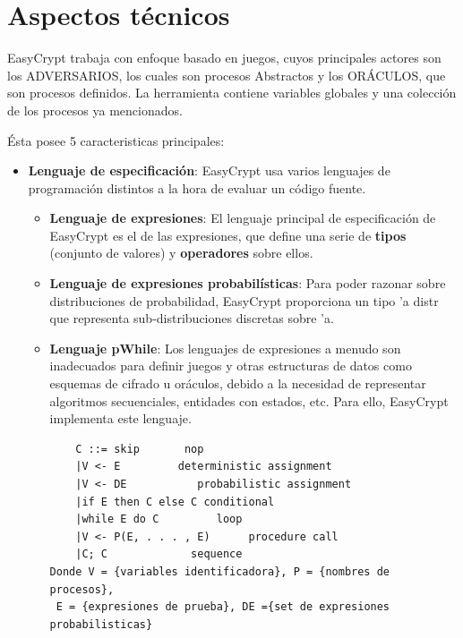 \documentclass[runningheads,a4paper]{llncs}
\begin{document}
\section{Aspectos técnicos}
EasyCrypt trabaja con enfoque basado en juegos, cuyos principales actores son los ADVERSARIOS, los cuales son procesos Abstractos y los ORÁCULOS, que son procesos definidos. La herramienta contiene variables globales y una colección de los procesos ya mencionados.

Ésta posee 5 caracteristicas principales:
\begin{itemize}
	\item \textbf{Lenguaje de especificación}:
EasyCrypt usa varios lenguajes de programación distintos a la hora de evaluar un código fuente. 

\begin{itemize}
		\item \textbf{Lenguaje de expresiones}:
El lenguaje principal de especificación de EasyCrypt es el de las expresiones, que define una serie de \textbf{tipos} (conjunto de valores) y \textbf{operadores} sobre ellos. 	
	
		\item \textbf{Lenguaje de expresiones probabilísticas}:
Para poder razonar sobre distribuciones de probabilidad, EasyCrypt proporciona un tipo 'a distr que representa sub-distribuciones discretas sobre 'a. 
		\item \textbf{Lenguaje pWhile}:		
Los lenguajes de expresiones a menudo son inadecuados para definir juegos y otras estructuras de datos como esquemas de cifrado u oráculos, debido a la necesidad de representar algoritmos secuenciales, entidades con estados, etc. Para ello, EasyCrypt implementa este lenguaje.

\begin{Verbatim}
	C ::= skip		 nop
	|V <- E		    deterministic assignment
	|V <- DE		   probabilistic assignment
	|if E then C else C	conditional
	|while E do C	      loop
	|V <- P(E, . . . , E)      procedure call
	|C; C		      sequence
Donde V = {variables identificadora}, P = {nombres de procesos},
 E = {expresiones de prueba}, DE ={set de expresiones probabilisticas}
\end{Verbatim}
\end{itemize}


\end{itemize}
\end{document}
